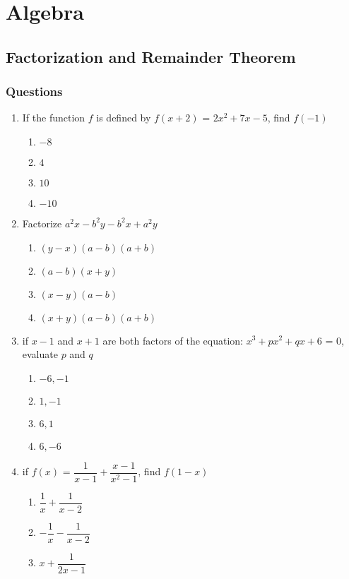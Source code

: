 \chapter{Algebra}
\section{Factorization and Remainder Theorem}
\subsection{Questions}
\begin{multicols}{2}
\begin{enumerate}[label={\arabic*.}]
\item If the function \(f\) is defined by \(f(x+2)\) = \(2{x}^{2} + 7x -5\), find \(f(-1)\)
	\begin{enumerate}[label={\Alph*.}]
	\item \(-8\)
	\item \(4\)
	\item \(10\)
	\item \(-10\)
	\end{enumerate}
\item Factorize \(a^2x - b^2y - b^2x + a^2y\)
	\begin{enumerate}[label={\Alph*.}]
	\item \((y-x)(a-b)(a+b)\)
	\item \((a-b)(x+y)\)
	\item \((x-y)(a-b)\)
	\item \((x+y)(a-b)(a+b)\)
	\end{enumerate}
\item if \(x - 1\) and \(x + 1\) are both factors of the equation: \({x}^{3} + p{x}^{2} + qx + 6 \) = 0, 
evaluate $p$ and $q$
	\begin{enumerate}[label={\Alph*.}]
	\item \(-6, -1\)
	\item \(1, -1\)
	\item \(6, 1\)
	\item \(6, -6\)
	\end{enumerate}
\item if \(f(x)\) = \(\dfrac{1}{x - 1} + \dfrac{x - 1}{{x}^{2} - 1}\), find \(f(1 - x)\)
	\begin{enumerate}[label={\Alph*.}]
	\item \(\dfrac{1}{x} + \dfrac{1}{x - 2}\)
	\item \( -\dfrac{1}{x} - \dfrac{1}{x - 2}\)
	\item \(x + \dfrac{1}{2x - 1}\)

\end{enumerate}
\end{enumerate}
\end{multicols}
